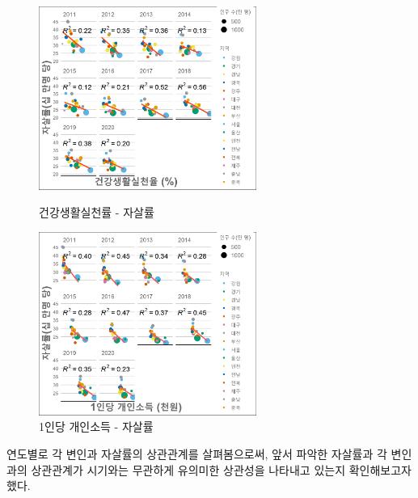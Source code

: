 \documentclass[a4paper, 11pt]{oblivoir}
\begin{document}
    \begin{figure}[!ht]
        \includegraphics[height = 6cm, width = \linewidth]{c5.png}
        \caption{건강생활실천률 - 자살률}
        \label{fig:pic141}
        \endminipage\hfill
        \includegraphics[height = 6cm, width = \linewidth]{c2.png}
        \caption{1인당 개인소득 - 자살률}
        \label{fig:pic151}
        \endminipage\hfill
    \end{figure}
    연도별로 각 변인과 자살률의 상관관계를 살펴봄으로써, 앞서 파악한 자살률과 각 변인과의 상관관계가 시기와는 무관하게
    유의미한 상관성을 나타내고 있는지 확인해보고자 했다. 
    
\end{document}
